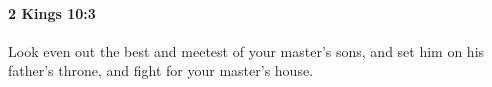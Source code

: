 
		\paragraph{2 Kings 10:3} %
			\label{2KINGS-10-3}

			Look even out the best and meetest of your master’s sons, and set him on his father’s throne, and fight for your master’s house.


